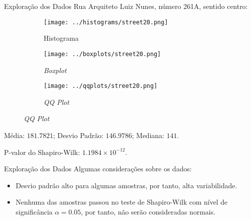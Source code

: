 \begin{frame}{Exploração dos Dados}
Rua Arquiteto Luiz Nunes, número 261A, sentido centro:
\vskip 0.05cm
\begin{figure}
	\centering
	\begin{subfigure}{.33\textwidth}
		\centering
		\texttt{[image: ../histograms/street20.png]}
		\caption*{Histograma}
	\end{subfigure}%
	\begin{subfigure}{.33\textwidth}
		\centering
		\texttt{[image: ../boxplots/street20.png]}
		\caption*{\textit{Boxplot}}
	\end{subfigure}
	\begin{subfigure}{.32\textwidth}
		\centering
		\texttt{[image: ../qqplots/street20.png]}
		\caption*{\textit{QQ Plot}}
	\end{subfigure}
\end{figure}
\vskip 0.05cm
Média: $181.7821$; Desvio Padrão: $146.9786$; Mediana: $141$.

P-valor do Shapiro-Wilk: $1.1984 \times 10^{-12}$.
\end{frame}


\begin{frame}{Exploração dos Dados}
	Algumas considerações sobre os dados:
	\vskip 0.5cm
	\begin{itemize}
		\item Desvio padrão alto para algumas amostras, por tanto, alta variabilidade.
		\item Nenhuma das amostras passou no teste de Shapiro-Wilk com nível de
		significância $\alpha = 0.05$, por tanto, não serão consideradas
		normais.
	\end{itemize}
\end{frame}